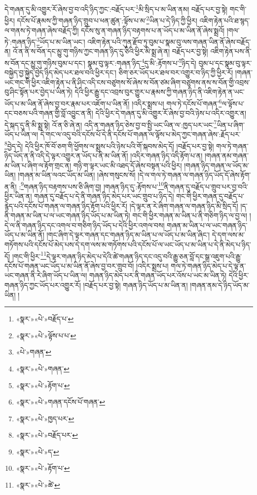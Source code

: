 དེ་གཞན་དུ་མི་འགྱུར་རོ་ཞེས་བྱ་བ་འདི་ཉིད་ཀྱང་:བརྗོད་པར་\footnote{«སྣར་»«པེ་»བརྗོད་པ་}མི་སྲིད་པ་མ་ཡིན་ནམ། བརྗོད་པར་བྱ་སྟེ། གང་གི་ཕྱིར། དངོས་པོ་རྣམས་ཀྱི་གཞན་ཉིད་གྲུབ་པ་ཕན་ཚུན་:ལྟོས་པ་མ་\footnote{«སྣར་»«པེ་»ལྟོས་པ་པ་}ཡིན་པ་དེ་ཉིད་ཀྱི་ཕྱིར། འཇིག་རྟེན་པའི་ཐ་སྙད་ལ་གནས་ཏེ་གཞན་ཞེས་བརྗོད་ཀྱི། དངོས་སུ་ན་གཞན་ཉིད་བརྟགས་པ་ན་ཡོད་པ་མ་ཡིན་ནོ་ཞེས་སྨྲའོ། །གལ་ཏེ་:གཞན་ཉིད་\footnote{«པེ་»གཞན་}ཡོད་པ་མ་ཡིན་ཡང་། འཇིག་རྟེན་པའི་ཀུན་རྫོབ་ཏུ་བུམ་པ་སྣམ་བུ་ལས་གཞན་ཡིན་ནོ་ཞེས་བརྗོད་ན། འོ་ན་ནི་ས་བོན་དང་མྱུ་གུ་གཉིས་ཀྱང་གཞན་ཉིད་དུ་ཅིའི་ཕྱིར་མི་སྨྲ་ཞེ་ན། བརྗོད་པར་བྱ་སྟེ། འཇིག་རྟེན་པས་ནི་ས་བོན་དང་མྱུ་གུ་གཉིས་བུམ་པ་དང་། སྣམ་བུ་ལྟར་:གཞན་ཉིད་\footnote{«སྣར་»«པེ་»གཞན་}དུ་མི་:རྟོགས་པ་\footnote{«སྣར་»«པེ་»རྟོག་པ་}ཉིད་དེ། བུམ་པ་དང་སྣམ་བུ་ལྟར་བསྐྱེད་བྱ་སྐྱེད་བྱེད་ཉིད་མེད་པར་ཐལ་བའི་ཕྱིར་དང་། ཅིག་ཅར་ཡོད་པར་ཐལ་བར་འགྱུར་བ་ཉིད་ཀྱི་ཕྱིར་རོ། །གཞན་ཡང་གང་གི་ཕྱིར་འཇིག་རྟེན་པ་ནི་ཤིང་འདི་ངས་བཙུགས་སོ་ཞེས་ས་བོན་ཙམ་ཞིག་བཙུགས་ནས་ས་བོན་གྱི་འབྲས་བུ་ཤིང་སྟོན་པར་བྱེད་པ་ཡིན་ཏེ། དེའི་ཕྱིར་རྒྱུ་དང་འབྲས་བུར་གྱུར་པ་རྣམས་ཀྱི་གཞན་ཉིད་ནི་འཇིག་རྟེན་ན་ཡང་ཡོད་པ་མ་ཡིན་ནོ་ཞེས་བྱ་བར་རྣམ་པར་འཇོག་པ་ཡིན་ནོ། །འདིར་སྨྲས་པ། གལ་ཏེ་དངོས་པོ་གཞན་\footnote{«སྣར་»«པེ་»གཞན་དངོས་པོ་གཞན་}ལ་ལྟོས་པ་དང་བཅས་པའི་གཞན་གྱི་བློ་འབྱུང་ན་ནི། དེའི་ཕྱིར་དེ་གཞན་དུ་མི་འགྱུར་རོ་ཞེས་བྱ་བའི་ཉེས་པ་འདིར་འགྱུར་ན། དེ་སྐད་དུ་ནི་མི་སྨྲ་སྟེ། འོ་ན་ཅི་ཞེ་ན། འདི་ན་གཞན་ཉིད་ཅེས་བྱ་བ་སྤྱི་ཡང་ཡིན་ལ་:ཁྱད་པར་ཡང་\footnote{«སྣར་»«པེ་»ཁྱད་པར་}ཡིན་པ་ཞིག་ཡོད་པ་ཡིན་ལ། དེ་གང་ལ་འདུ་བའི་དངོས་པོ་དེ་ནི་དངོས་པོ་གཞན་ལ་ལྟོས་པ་མེད་ཀྱང་གཞན་ཞེས་:རྗོད་པར་\footnote{«སྣར་»«པེ་»བརྗོད་པར་}བྱེད་དེ། དེའི་ཕྱིར་ཁོ་བོ་ཅག་གི་ཕྱོགས་ལ་སྨྲས་པའི་ཉེས་པའི་གོ་སྐབས་མེད་དོ། །བརྗོད་པར་བྱ་སྟེ། གལ་ཏེ་གཞན་ཉིད་ཡོད་ན་ནི་འདི་དེ་ལྟར་འགྱུར་ན་ཡོད་པ་ནི་མ་ཡིན་ནོ། །འདིར་གཞན་ཉིད་འདི་རྟོག་པ་ན། །གཞན་ནམ་གཞན་མ་ཡིན་པ་ཞིག་ལ་རྟོག་གྲང་ན། གཉི་ག་ལྟར་ཡང་མི་འཐད་དོ་ཞེས་བསྟན་པའི་ཕྱིར། །གཞན་ཉིད་གཞན་ལ་ཡོད་མ་ཡིན། །གཞན་མ་ཡིན་ལའང་ཡོད་མ་ཡིན། །ཞེས་གསུངས་སོ། །དེ་ལ་གལ་ཏེ་གཞན་ལ་གཞན་ཉིད་ཡོད་དོ་ཞེས་རྟོག་ན་ནི། :\footnote{«སྣར་»«པེ་»ད་}གཞན་ཉིད་བརྟགས་པས་ཅི་ཞིག་བྱ། །གཞན་ཉིད་དུ་:རྟོགས་པ་\footnote{«སྣར་»«པེ་»རྟོག་པ་}ནི་གཞན་དུ་བརྗོད་པ་གྲུབ་པར་བྱ་བའི་ཕྱིར་ཡིན་ན། གཞན་དུ་བརྗོད་པ་དེ་ནི་གཞན་ཉིད་མེད་པར་ཡང་གྲུབ་པ་ཉིད་དེ། གང་གི་ཕྱིར་གཞན་དུ་བརྗོད་པ་རྙེད་པའི་དངོས་པོ་གཞན་ལ་གཞན་ཉིད་རྟོག་པའི་ཕྱིར་རོ། །དེ་ལྟར་ན་རེ་ཞིག་གཞན་ལ་གཞན་ཉིད་མི་སྲིད་དོ། །ད་ནི་གཞན་མ་ཡིན་པ་ལ་ཡང་གཞན་ཉིད་ཡོད་པ་མ་ཡིན་ཏེ། གང་གི་ཕྱིར་གཞན་མ་ཡིན་པ་ནི་གཅིག་ཉིད་ལ་བྱ་ལ། །དེ་ལ་ནི་གཞན་ཉིད་དང་འགལ་བ་གཅིག་ཉིད་ཡོད་པ་དེའི་ཕྱིར་འགལ་བས། གཞན་མ་ཡིན་པ་ལ་ཡང་གཞན་ཉིད་ཡོད་པ་མ་ཡིན་ནོ། །གང་ཞིག་དེ་ལྟར་གཞན་དང་གཞན་ཉིད་མ་ཡིན་པ་ལ་ཡོད་པ་མ་ཡིན་ཞིང་། དེ་དག་ལས་མ་གཏོགས་པའི་དངོས་པོ་མེད་པས་དེ་དག་ལས་མ་གཏོགས་པའི་དངོས་པོ་ལ་ཡང་ཡོད་པ་མ་ཡིན་པ་དེ་ནི་མེད་པ་ཉིད་དོ། །གང་གི་ཕྱིར་\footnote{«སྣར་»«པེ་»ཚེ་}དེ་ལྟར་གཞན་ཉིད་མེད་པ་དེའི་ཚེ་གཞན་ཉིད་དང་འདུ་བའི་རྒྱུ་ཅན་བློ་དང་སྒྲ་འཇུག་པའི་རྒྱུ་དངོས་པོ་གཞན་ཡང་ཡོད་པ་མ་ཡིན་ནོ་ཞེས་བྱ་བར་གྲུབ་བོ། །འདིར་སྨྲས་པ། གལ་ཏེ་གཞན་ཉིད་མེད་པ་དེ་ལྟ་ན་ཡང་གཞན་ནི་རེ་ཞིག་ཡོད་པ་ཡིན་ལ། གཞན་ཉིད་མེད་པར་ནི་གཞན་ཡོད་པར་འོས་པ་ཡང་མ་ཡིན་ཏེ། དེའི་ཕྱིར་གཞན་ཉིད་ཀྱང་ཡོད་པར་འགྱུར་རོ། །བརྗོད་པར་བྱ་སྟེ། གཞན་ཉིད་ཡོད་པ་མ་ཡིན་ན། །གཞན་ནམ་དེ་ཉིད་ཡོད་མ་ཡིན། །
